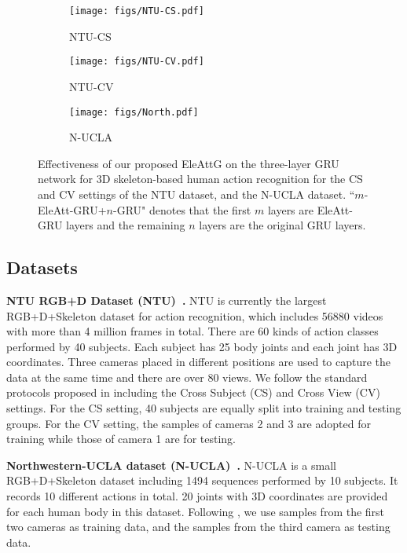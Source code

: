 \documentclass[journal]{IEEEtran}
\begin{document}
\begin{figure*}[!]
	\centering
	\begin{subfigure}[t]{0.32\linewidth}
		\centering\texttt{[image: figs/NTU-CS.pdf]}
		\caption{NTU-CS}
		\label{subfig:CS}
	\end{subfigure}	
	\hfil
	\begin{subfigure}[t]{0.32\linewidth}
		\centering\texttt{[image: figs/NTU-CV.pdf]}
		\caption{NTU-CV}			
		\label{subfig:CV}
	\end{subfigure}
	\hfil
	\begin{subfigure}[t]{0.32\linewidth}
		\centering\texttt{[image: figs/North.pdf]}
		\caption{N-UCLA}			
		\label{subfig:N-UCLA}
	\end{subfigure}
	\caption{Effectiveness of our proposed EleAttG on the three-layer GRU network for 3D skeleton-based human action recognition for the CS and CV settings of the NTU dataset, and the N-UCLA dataset. ``$m$-EleAtt-GRU+$n$-GRU" denotes that the first $m$ layers are EleAtt-GRU layers and the remaining $n$ layers are the original GRU layers.}
	\label{fig:layer}
\end{figure*}

\subsection{Datasets}
\label{datasets}
\textbf{NTU RGB+D Dataset (NTU)~\cite{Shahroudy_2016_CVPR}.} NTU is currently the largest RGB+D+Skeleton dataset for action recognition, which includes 56880 videos with more than 4 million frames in total. There are 60 kinds of action classes performed by 40 subjects. Each subject has 25 body joints and each joint has 3D coordinates. Three cameras placed in different positions are used to capture the data at the same time and there are over 80 views. We follow the standard protocols proposed in \cite{Shahroudy_2016_CVPR} including the Cross Subject (CS) and Cross View (CV) settings. For the CS setting, 40 subjects are equally split into training and testing groups. For the CV setting, the samples of cameras 2 and 3 are adopted for training while those of camera 1 are for testing. 

\textbf{Northwestern-UCLA dataset (N-UCLA)~\cite{wang2014cross}.} N-UCLA is a small RGB+D+Skeleton dataset including 1494 sequences performed by 10 subjects. It records 10 different actions in total. 20 joints with 3D coordinates are provided for each human body in this dataset. Following \cite{wang2014cross}, we use samples from the first two cameras as training data, and the samples from the third camera as testing data. 
\end{document}
